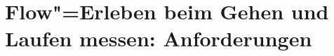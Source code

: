 

\chapter{Flow"=Erleben beim Gehen und Laufen messen: Anforderungen} 

\label{cha:flow_erleben_beim_gehen_und_laufen_messen_anforderungen}

      

